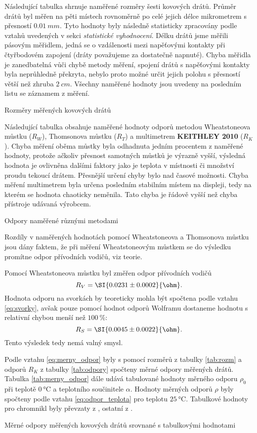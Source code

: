 \documentclass[0-protokol.tex]{subfiles}
\begin{document}
Následující tabulka shrnuje naměřené rozměry šesti kovových drátů. Průměr drátů byl měřen na pěti místech rovnoměrně po celé jejich délce mikrometrem s přesností $\SI{0.01}{mm}$. Tyto hodnoty byly následně statisticky zpracovány  podle vztahů uvedených v sekci \textit{statistické vyhodnocení}. Délku drátů jsme měřili pásovým měřidlem, jedná se o vzdálenosti mezi napěťovými kontakty při čtyřbodovém zapojení (dráty považujeme za dostatečně napnuté). Chyba měřidla je zanedbatelná vůči chybě metody měření, spojení drátů s napěťovými kontakty byla neprůhledně překryta, nebylo proto možné určit jejich polohu s přesností větší než zhruba $\SI{2}{cm}$. Všechny naměřené hodnoty jsou uvedeny na posledním listu se záznamem z měření.
\begin{table}[H] 
\centering
\setlength{\tabcolsep}{10pt}

\caption{Rozměry měřených kovových drátů}
\label{tab:rozm}
\end{table}

Následující tabulka obsahuje naměřené hodnoty odporů metodou Wheatstoneova můstku ($R_W$), Thomsonova můstku ($R_T$) a multimetrem \textbf{KEITHLEY 2010} ($R_K$). Chyba měření oběma můstky byla odhadnuta jedním procentem z naměřené hodnoty, protože ačkoliv přesnost samotných můstků je výrazně vyšší, výsledná hodnota je ovlivněna dalšími faktory jako je teplota v místnosti či množství proudu tekoucí drátem. Přesnější určení chyby bylo nad časové možnosti. Chyba měření multimetrem byla určena posledním stabilním místem na displeji, tedy na kterém se hodnota chaoticky neměnila. Tato chyba je řádově vyšší než chyba přístroje udávaná výrobcem.
\begin{table}[H] 
\centering
\setlength{\tabcolsep}{3pt}

\caption{Odpory naměřené různými metodami}
\label{tab:odpory}
\end{table}

Rozdíly v naměřených hodnotách pomocí Wheatstoneova a Thomsonova můstku jsou dány faktem, že při měření Wheatstoneovým můstkem se do výsledku promítne odpor přívodních vodičů, viz teorie. 

Pomocí Wheatstoneova můstku byl změřen odpor přívodních vodičů 
$$R_V = \SI{0.0231 \pm 0.0002}{\ohm}.$$ 
Hodnota odporu na svorkách by teoreticky mohla být spočtena podle vztahu \eqref{eq:svorky}, avšak pouze pomocí hodnot odporů Wolframu dostaneme hodnotu s relativní chybou menší než $\SI{100}{\percent}$: 
$$R_S = \SI{0.0045 \pm 0.0022}{\ohm}.$$
 Tento výsledek tedy nemá valný smysl.

Podle vztahu \eqref{eq:merny_odpor} byly s pomocí rozměrů z tabulky \ref{tab:rozm} a odporů $R_K$ z tabulky \ref{tab:odpory} spočteny měrné odpory měřených drátů. Tabulka \ref{tab:merny_odpor} dále udává tabulované hodnoty měrného odporu $\rho_0$ při teplotě $\SI{0}{\celsius}$ a teplotního součinitele $\alpha$. Hodnoty měrných odporů $\rho$ byly spočteny podle vztahu \eqref{eq:odpor_teplota} pro teplotu $\SI{25}{\celsius}$. Tabulkové hodnoty pro chromnikl byly převzaty z \cite{tab_crni}, ostatní z \cite{tab_ostatni}.
\begin{table}[H] 
\centering
\setlength{\tabcolsep}{7pt}

\caption{Měrné odpory měřených kovových drátů srovnané s tabulkovými hodnotami}
\label{tab:merny_odpor}
\end{table}
\end{document}
